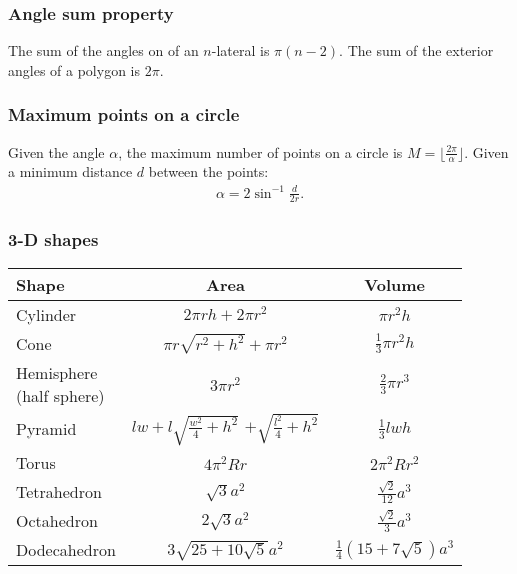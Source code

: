 \subsubsection{Angle sum property}
The sum of the angles on of an $n$-lateral is $\pi(n - 2)$. The sum of the exterior angles of a polygon is $2\pi$.

\subsubsection{Maximum points on a circle}
Given the angle $\alpha$, the maximum number of points on a circle is $M = \lfloor \frac{2\pi}\alpha\rfloor$. Given a minimum distance $d$ between the points:
\begin{align*}
    \alpha = 2 \sin^{-1} \frac d{2r}.
\end{align*}

\subsubsection{3-D shapes}
\begin{table}[H]
    \centering
    \begin{tabular}{|l|c|c|}
        \hline
        Shape & Area & Volume \\
        \hline
        Cylinder & $2\pi rh + 2\pi r^2$ & $\pi r^2 h$ \\
        Cone & $\pi r\sqrt{r^2+h^2} + \pi r^2$ & $\frac13 \pi r^2 h$ \\
        \makecell[l]{Hemisphere\\(half sphere)} & $3\pi r^2$ & $\frac23\pi r^3$ \\
        Pyramid & \makecell{$lw + l\sqrt{\frac{w^2}4 + h^2}$\\$+ \sqrt{\frac{l^2}4 + h^2}$} & $\frac13lwh$ \\
        Torus & $4\pi^2Rr$ & $2\pi^2Rr^2$ \\
        Tetrahedron & $\sqrt3 a^2$ & $\frac{\sqrt2}{12}a^3$ \\
        Octahedron & $2\sqrt3 a^2$ & $\frac{\sqrt2}3 a^3$ \\
        Dodecahedron & $3\sqrt{25 + 10\sqrt5}a^2$ & $\frac14(15 + 7\sqrt5)a^3$ \\
        \hline
    \end{tabular}
    \label{tab:shapes}
\end{table}

